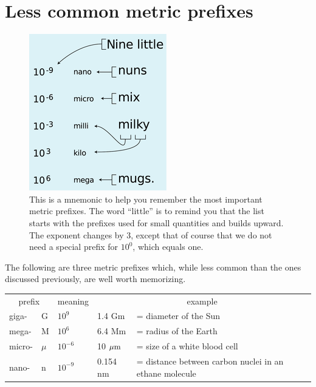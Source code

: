 \section{Less common metric prefixes}\label{sec:exotic-prefixes}


\begin{figure}
\begin{center}
\includegraphics{./introduction/figs/metric-mnemonic}
\caption{      This is a mnemonic to help you remember the most important metric
      prefixes. The word ``little'' is to remind you that the list starts with the prefixes used for
      small quantities and builds upward. The exponent changes by 3, except that of course that we
      do not need a special prefix for $10^0$, which equals one.}
\end{center}
\end{figure}

\vspace{1.5mm}
The following are three metric prefixes which, while less
common than the ones discussed previously, are well worth memorizing.
\begin{center}
\noindent\begin{tabular}{llllp{48mm}}
    \multicolumn{2}{c}{prefix} & meaning & \multicolumn{2}{c}{example} \\
   giga-   &  G      &$10^9$     & 1.4 Gm             &=  diameter of the Sun  \\
    mega-   &  M      &$10^6$     & 6.4 Mm             &=  radius of the Earth  \\
    micro-  &  $\mu$  &$10^{-6}$  & 10 $\mu\textup{m}$     &=  size of a white blood cell  \\
    nano-   &   n     &$10^{-9}$  & 0.154 nm           &=  distance between carbon nuclei in an ethane molecule
\end{tabular}
\end{center}

